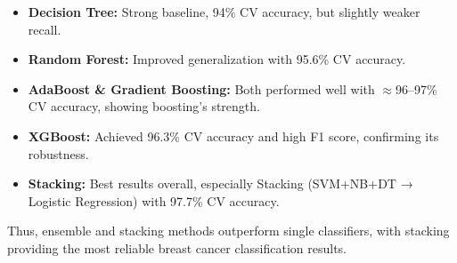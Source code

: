 \documentclass[12pt]{article}
\begin{document}
\begin{itemize}
\item \textbf{Decision Tree:} Strong baseline, 94\% CV accuracy, but slightly weaker recall.  
\item \textbf{Random Forest:} Improved generalization with 95.6\% CV accuracy.  
\item \textbf{AdaBoost \& Gradient Boosting:} Both performed well with $\approx$96–97\% CV accuracy, showing boosting’s strength.  
\item \textbf{XGBoost:} Achieved 96.3\% CV accuracy and high F1 score, confirming its robustness.  
\item \textbf{Stacking:} Best results overall, especially Stacking (SVM+NB+DT → Logistic Regression) with 97.7\% CV accuracy.  
\end{itemize}

\noindent Thus, ensemble and stacking methods outperform single classifiers, with stacking providing the most reliable breast cancer classification results.
\end{document}
